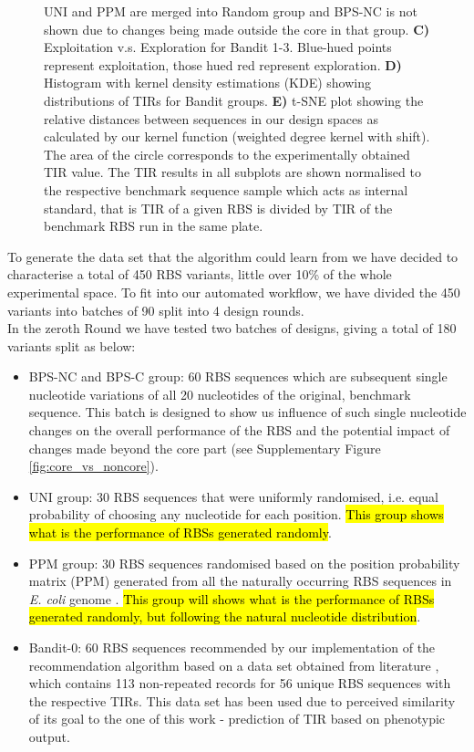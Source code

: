 \documentclass{article}
\newcommand{\mengyan}[1]{\textcolor{magenta}{#1}}
\begin{document}
\begin{figure}[!ht]
{    UNI and PPM are merged into Random group and BPS-NC is not shown due to changes being made outside the core in that group.
    \textbf{C)} Exploitation v.s. Exploration for Bandit 1-3. Blue-hued points represent exploitation, those hued red represent exploration.
    \textbf{D)} Histogram with kernel density estimations (KDE) showing distributions of TIRs for Bandit groups.
    \textbf{E)} t-SNE plot showing the relative distances between sequences in our design spaces as calculated by our kernel function (weighted degree kernel with shift).
    The area of the circle corresponds to the experimentally obtained TIR value.
    The TIR results in all subplots are shown normalised to the respective benchmark sequence sample which acts as internal standard, that is TIR of a given RBS is divided by TIR of the benchmark RBS run in the same plate. }
    \label{fig: Swarmplot and Quantplot}
\end{figure}

To generate the data set that the algorithm could learn from we have decided to characterise a total of 450 RBS variants, little over 10\% of the whole experimental space.
To fit into our automated workflow, we have divided the 450 variants into batches of 90 split into 4 design rounds.\\

In the zeroth Round we have tested two batches of designs, giving a total of 180 variants split as below:

\begin{itemize}
    \item BPS-NC and BPS-C group: 60 RBS sequences which are subsequent single nucleotide variations of all 20 nucleotides of the original, benchmark sequence. This batch is designed to show us influence of such single nucleotide changes on the overall performance of the RBS and the potential impact of changes made beyond the core part (see Supplementary Figure \ref{fig:core_vs_noncore}).
    \item UNI group: 30 RBS sequences that were  uniformly randomised, i.e. equal probability of choosing any nucleotide for each position. \hl{This group shows what is the performance of RBSs generated randomly}.
    \item PPM group: 30 RBS sequences randomised based on the position probability matrix (PPM) generated from all the naturally occurring RBS sequences in \emph{E. coli} genome \cite{barrick1994quantitative}. \hl{This group will shows what is the performance of RBSs generated randomly, but following the natural nucleotide distribution}.
    \item Bandit-0: 60 RBS sequences recommended by our implementation of the recommendation algorithm based on a data set obtained from literature \cite{jervis2018machine}, which contains 113 non-repeated records for 56 unique RBS sequences with the respective TIRs.
    This data set has been used due to perceived similarity of its goal to the one of this work - prediction of TIR based on phenotypic output.
\end{itemize}
\end{document}
